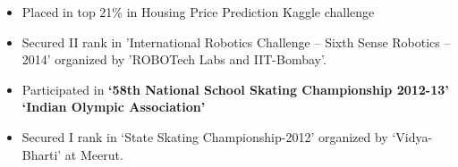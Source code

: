\documentclass[10pt,a4paper,ragged2e]{altacv}
\begin{document}
\begin{itemize}
\item Placed in top 21\% in Housing Price Prediction Kaggle challenge
\item Secured II rank in 'International Robotics Challenge – Sixth Sense Robotics – 2014' organized by 'ROBOTech Labs and IIT-Bombay'.
\smallskip
\item{Participated in }\bf{‘58th National School Skating Championship 2012-13’}\bf{ ‘Indian Olympic Association’}
\smallskip
\item \normalfont Secured I rank in ‘State Skating Championship-2012’ organized by ‘Vidya-Bharti’ at Meerut.
\end{itemize}





\clearpage


\nocite{*}






\end{document}
